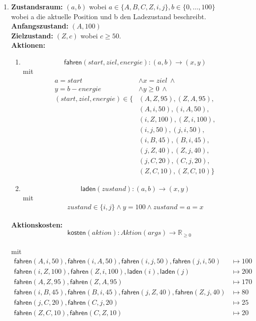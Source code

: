 \documentclass[a4paper,10pt]{article}
\begin{document}
\begin{enumerate}[~~a)]
    \item
    \textbf{Zustandsraum:} 
    $(a, b)$ wobei $ a \in \{A, B, C, Z, i, j\}, b \in \{0,\dots,100\} $ \\
    wobei a die aktuelle Position und b den Ladezustand beschreibt. \\
    \textbf{Anfangszustand:}
    $(A,100)$ \\
    \textbf{Zielzustand:}
    $(Z,c)$ wobei $c \ge 50$. \\
    \textbf{Aktionen:}
    \begin{enumerate}[~~1.]
    \item $$\textsf{fahren}(start, ziel, energie): (a, b) \rightarrow (x, y)$$ 
    mit 
    \begin{align*}
        a = start &\land x = ziel ~\land \\
        y = b - energie  &\land y \ge 0 ~\land\\
        (start, ziel, energie)  \in \{&(A, Z, 95), (Z, A, 95),\\
        &(A,i,50), (i,A,50),\\
        &(i,Z,100), (Z,i,100),\\
        &(i,j,50), (j,i,50),\\
        &(i,B,45), (B,i,45),\\
        &(j,Z,40), (Z,j,40),\\
        &(j,C,20), (C,j,20),\\
        &(Z,C,10), (Z,C,10)\}
    \end{align*}
    \item $$\textsf{laden}(zustand): (a, b) \rightarrow (x, y)$$ 
    mit 
    \begin{align*}
        zustand \in \{ i, j \} \land y = 100 \land zustand = a = x
    \end{align*}
    \end{enumerate}
    \textbf{Aktionskosten:} \\
    $$\textsf{kosten}(aktion): Aktion(args) \rightarrow \mathbb R_{\ge 0}$$\\   mit
    \begin{align*}
    \textsf{fahren}(A,i,50), \textsf{fahren}(i,A,50), \textsf{fahren}(i,j,50), \textsf{fahren}(j,i,50) &\mapsto 100\\
    \textsf{fahren}(i,Z,100), \textsf{fahren}(Z,i,100),\textsf{laden}(i), \textsf{laden}(j) &\mapsto 200\\
    \textsf{fahren}(A,Z,95), \textsf{fahren}(Z,A,95) &\mapsto 170\\
    \textsf{fahren}(i,B,45), \textsf{fahren}(B,i,45), \textsf{fahren}(j,Z,40), \textsf{fahren}(Z,j,40) &\mapsto 80\\
    \textsf{fahren}(j,C,20), \textsf{fahren}(C,j,20) &\mapsto 25\\
    \textsf{fahren}(Z,C,10), \textsf{fahren}(C,Z,10) &\mapsto 20
    \end{align*}


\end{enumerate}
\end{document}
